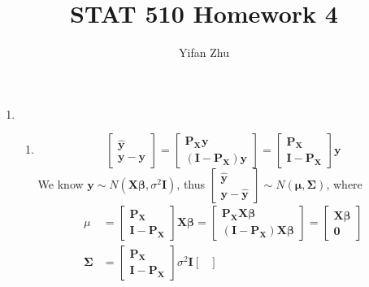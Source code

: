 \documentclass{article}
\begin{document}
	\setcounter{MaxMatrixCols}{20}
	

	
	\title{STAT 510 Homework 4}
	\author{Yifan Zhu}
	\maketitle
	
	\begin{enumerate}[leftmargin = 0 em, label = \arabic*., font = \bfseries]
	\item 
	\begin{enumerate}
		\item 
		\[\begin{bmatrix}
			\hat{\bm y}\\
			\bm y - \bm y
		\end{bmatrix} = 
		\begin{bmatrix}
			\bm P_{\bm X} \bm y\\
			(\bm I - \bm P_{\bm X}) \bm y
		\end{bmatrix} = 
		\begin{bmatrix}
			\bm P_{\bm X}\\
			\bm I - \bm P_{\bm X}
		\end{bmatrix} \bm y\]
		We know $\bm y \sim N(\bm X \bm \beta , \sigma^2 \bm I)$, thus $\begin{bmatrix}
			\hat{\bm y}\\
			\bm y - \hat{\bm y}
		\end{bmatrix} \sim N(\bm \mu , \bm \Sigma)$, where
		\begin{align*}
		\mu &= \begin{bmatrix}
			\bm P_{\bm X}\\
			\bm I - \bm P_{\bm X}
		\end{bmatrix} \bm X \bm \beta = \begin{bmatrix}
			\bm P_{\bm X} \bm X \bm \beta\\
			(\bm I - \bm P_{\bm X}) \bm X \bm \beta
		\end{bmatrix} = \begin{bmatrix}
			\bm X \bm \beta\\
			\bm 0
		\end{bmatrix}\\
		\bm \Sigma &= \begin{bmatrix}
			\bm P_{\bm X}\\
			\bm I - \bm P_{\bm X}
		\end{bmatrix} \sigma^2 \bm I \begin{bmatrix}

\end{bmatrix}
\end{align*}
\end{enumerate}
\end{enumerate}
\end{document}
